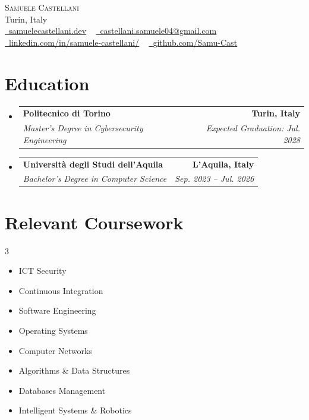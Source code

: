 \documentclass[letterpaper,11pt]{article}
\makeatletter
\newcommand{\resumeSubheading}[4]{
  \vspace{-2pt}\item
    \begin{tabular*}{1.0\textwidth}[t]{l@{\extracolsep{\fill}}r}
      \textbf{#1} & \textbf{\small #2} \\
      \textit{\small#3} & \textit{\small #4} \\
    \end{tabular*}\vspace{-7pt}
}
\newcommand{\resumeSubHeadingListStart}{\begin{itemize}[leftmargin=0.0in, label={}]}
\newcommand{\resumeSubHeadingListEnd}{\end{itemize}}
\makeatother
\begin{document}
\begin{center}
    {\Huge \scshape Samuele Castellani} \\ \vspace{1pt}
    Turin, Italy \\ \vspace{1pt}
    \small \href{https://samuelecastellani.dev}{\raisebox{-0.2\height}\faGlobe\ \underline{samuelecastellani.dev}} ~ \href{mailto:castellani.samuele04@gmail.com}{\raisebox{-0.2\height}\faEnvelope\  \underline{castellani.samuele04@gmail.com}} ~
    \href{https://www.linkedin.com/in/samuele-castellani/}{\raisebox{-0.2\height}\faLinkedin\ \underline{linkedin.com/in/samuele-castellani/}}  ~
    \href{https://github.com/Samu-Cast}{\raisebox{-0.2\height}\faGithub\ \underline{github.com/Samu-Cast}}
    \vspace{-8pt}
\end{center}

\section{Education}
  \resumeSubHeadingListStart
    \resumeSubheading
      {Politecnico di Torino}{Turin, Italy}
      {Master's Degree in Cybersecurity Engineering}{Expected Graduation: Jul. 2028}
    \resumeSubheading
      {Università degli Studi dell'Aquila}{L'Aquila, Italy}
      {Bachelor's Degree in Computer Science}{Sep. 2023 -- Jul. 2026}
  \resumeSubHeadingListEnd
\vspace{-15pt}

\section{Relevant Coursework}
    \begin{multicols}{3}
        \begin{itemize}[itemsep=-5pt, parsep=3pt]
            \item\small ICT Security
            \item Continuous Integration
            \item Software Engineering
            \item Operating Systems
            \item Computer Networks
            \item Algorithms \& Data Structures
            \item Databases Management
            \item Intelligent Systems \& Robotics
        \end{itemize}
    \end{multicols}
\vspace{-10pt}
\end{document}
